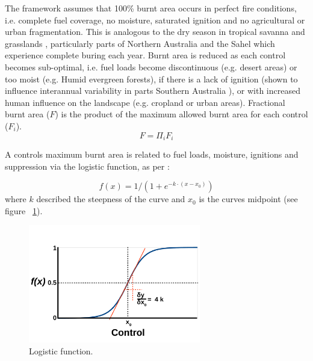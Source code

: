 The framework assumes that 100\% burnt area occurs in perfect fire conditions,  i.e. complete fuel coverage, no moisture, saturated ignition and no agricultural or urban fragmentation. This is analogous to the dry season in tropical savanna and grasslands \citep{kelley2014modelling}, particularly parts of Northern Australia \citep{murphy2013fire} and the Sahel \citep{van2008climate} which experience complete buring each year.
Burnt area is reduced as each control becomes sub-optimal, i.e.
    fuel loads become discontinuous  (e.g. desert areas)
    or too moist (e.g. Humid evergreen forests),
    if there is a lack of ignition (shown to influence interannual variability in parts Southern Australia \cite{bradstock2010biogeographic} ),
    or with increased human influence on the landscape (e.g. cropland or urban areas).
Fractional burnt area ($F$) is the product of the maximum allowed burnt area for each control ($F_i$).
\begin{equation}
    F=\Pi_{i} F_i
    \label{equ:LimFIRE}
\end{equation}

A controls maximum burnt area is related to fuel loads, moisture, ignitions and suppression via the logistic function, as per \citet{bistinas2014causal}:

\begin{equation}
    f(x) = 1 / (1 + e^{-k \cdot (x - x_0)})
    \label{equ:fx}
\end{equation}
where $k$ described the steepness of the curve and $x_0$ is the curves midpoint (see figure ~\ref{fig:Logistic_fun}).

\begin{figure}[!ht]
  \centering
    \includegraphics[width=0.67\textwidth]{Logistic_fun.pdf}
  \caption{Logistic function.}
  \label{fig:Logistic_fun}
\end{figure}

